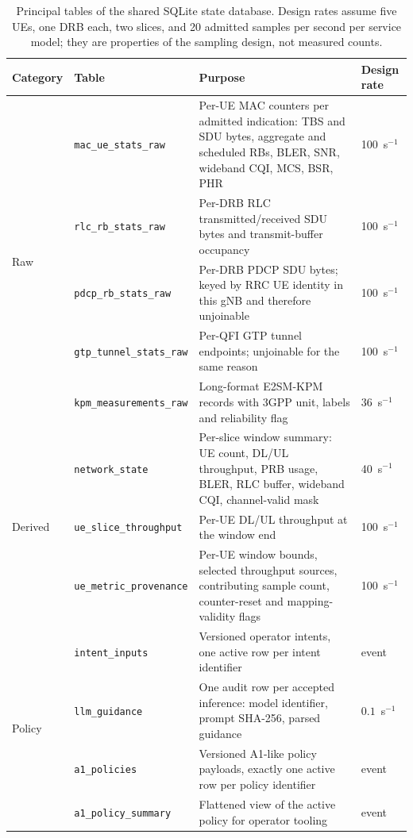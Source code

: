 \begin{table}[t]
\centering
\caption{Principal tables of the shared SQLite state database. Design rates assume five UEs, one DRB each, two slices, and 20 admitted samples per second per service model; they are properties of the sampling design, not measured counts.}
\label{tab:db-tables}
\footnotesize
\begin{tabular}{llp{}l}
\toprule
Category & Table & Purpose & Design rate\\
\midrule
\multirow{5}{*}{Raw}
 & \texttt{mac\_ue\_stats\_raw} & Per-UE MAC counters per admitted indication: TBS and SDU bytes, aggregate and scheduled RBs, BLER, SNR, wideband CQI, MCS, BSR, PHR & 100~s$^{-1}$\\
 & \texttt{rlc\_rb\_stats\_raw} & Per-DRB RLC transmitted/received SDU bytes and transmit-buffer occupancy & 100~s$^{-1}$\\
 & \texttt{pdcp\_rb\_stats\_raw} & Per-DRB PDCP SDU bytes; keyed by RRC UE identity in this gNB and therefore unjoinable & 100~s$^{-1}$\\
 & \texttt{gtp\_tunnel\_stats\_raw} & Per-QFI GTP tunnel endpoints; unjoinable for the same reason & 100~s$^{-1}$\\
 & \texttt{kpm\_measurements\_raw} & Long-format E2SM-KPM records with 3GPP unit, labels and reliability flag & 36~s$^{-1}$\\
\midrule
\multirow{3}{*}{Derived}
 & \texttt{network\_state} & Per-slice window summary: UE count, DL/UL throughput, PRB usage, BLER, RLC buffer, wideband CQI, channel-valid mask & 40~s$^{-1}$\\
 & \texttt{ue\_slice\_throughput} & Per-UE DL/UL throughput at the window end & 100~s$^{-1}$\\
 & \texttt{ue\_metric\_provenance} & Per-UE window bounds, selected throughput sources, contributing sample count, counter-reset and mapping-validity flags & 100~s$^{-1}$\\
\midrule
\multirow{6}{*}{Policy}
 & \texttt{intent\_inputs} & Versioned operator intents, one active row per intent identifier & event\\
 & \texttt{llm\_guidance} & One audit row per accepted inference: model identifier, prompt SHA-256, parsed guidance & $0.1$~s$^{-1}$\\
 & \texttt{a1\_policies} & Versioned A1-like policy payloads, exactly one active row per policy identifier & event\\
 & \texttt{a1\_policy\_summary} & Flattened view of the active policy for operator tooling & event\\

\end{tabular}
\end{table}
